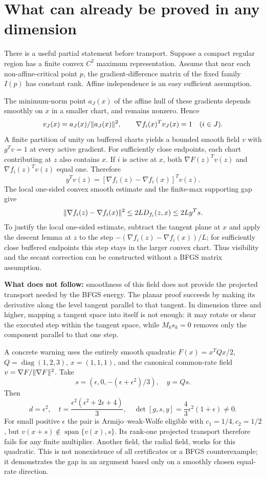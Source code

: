 \setcounter{section}{8}
\setcounter{theorem}{7}
\setcounter{equation}{17}
\section{What can already be proved in any dimension}
There is a useful partial statement before transport. Suppose a compact regular region has a finite convex $C^2$ maximum representation. Assume that near each non-affine-critical point $p$, the gradient-difference matrix of the fixed family $I(p)$ has constant rank. Affine independence is an easy sufficient assumption.

The minimum-norm point $a_J(x)$ of the affine hull of these gradients depends smoothly on $x$ in a smaller chart, and remains nonzero. Hence
\[
 v_J(x)=a_J(x)/\lVert a_J(x)\rVert^2,
 \qquad \nabla f_i(x)^Tv_J(x)=1\quad(i\in J).
\]
A finite partition of unity on buffered charts yields a bounded smooth field $v$ with $g^Tv=1$ at every active gradient. For sufficiently close endpoints, each chart contributing at $z$ also contains $x$. If $i$ is active at $x$, both $\nabla F(z)^Tv(z)$ and $\nabla f_i(z)^Tv(z)$ equal one. Therefore
\[
 y^Tv(z)=[\nabla f_i(z)-\nabla f_i(x)]^Tv(z).
\]
The local one-sided convex smooth estimate and the finite-max supporting gap give
\[
 \lVert \nabla f_i(z)-\nabla f_i(x)\rVert^2
 \le2L D_{f_i}(z,x)\le2L y^Ts.
\]
To justify the local one-sided estimate, subtract the tangent plane at $x$ and apply the descent lemma at $z$ to the step $-(\nabla f_i(z)-\nabla f_i(x))/L$; for sufficiently close buffered endpoints this step stays in the larger convex chart. Thus visibility and the secant correction can be constructed without a BFGS matrix assumption.

\textbf{What does not follow:} smoothness of this field does not provide the projected transport needed by the BFGS energy. The planar proof succeeds by making its derivative along the level tangent parallel to that tangent. In dimension three and higher, mapping a tangent space into itself is not enough: it may rotate or shear the executed step within the tangent space, while $M_ks_k=0$ removes only the component parallel to that one step.

A concrete warning uses the entirely smooth quadratic $F(x)=x^TQx/2$, $Q=\operatorname{diag}(1,2,3)$, $x=(1,1,1)$, and the canonical common-rate field $v=\nabla F/\lVert \nabla F\rVert^2$. Take
\[
 s=(\epsilon,0,-(\epsilon+\epsilon^2)/3),\quad y=Qs.
\]
Then
\[
 d=\epsilon^2,\quad t=\frac{\epsilon^2(\epsilon^2+2\epsilon+4)}3,\quad
 \det[g,s,y]=\frac43\epsilon^2(1+\epsilon)\ne0.
\]
For small positive $\epsilon$ the pair is Armijo--weak-Wolfe eligible with $c_1=1/4,c_2=1/2$, but $v(x+s)\notin\operatorname{span}\{v(x),s\}$. Its rank-one projected transport therefore fails for any finite multiplier. Another field, the radial field, works for this quadratic. This is not nonexistence of all certificates or a BFGS counterexample; it demonstrates the gap in an argument based only on a smoothly chosen equal-rate direction.


\endgroup
